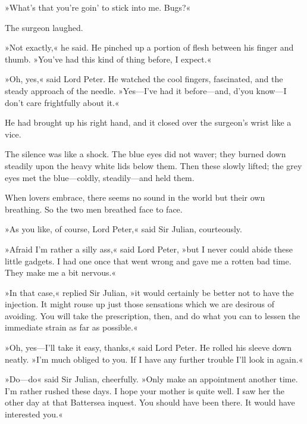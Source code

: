 »What's that you're goin' to stick into me. Bugs?«

The surgeon laughed.

»Not exactly,« he said. He pinched up a portion of flesh between his finger and thumb. »You've had this kind of thing before, I expect.«

»Oh, yes,« said Lord Peter. He watched the cool fingers, fascinated, and the steady approach of the needle. »Yes—I've had it before—and, d'you know—I don't care frightfully about it.«

He had brought up his right hand, and it closed over the surgeon's wrist like a vice.

The silence was like a shock. The blue eyes did not waver; they burned down steadily upon the heavy white lids below them. Then these slowly lifted; the grey eyes met the blue—coldly, steadily—and held them.

When lovers embrace, there seems no sound in the world but their own breathing. So the two men breathed face to face.

»As you like, of course, Lord Peter,« said Sir Julian, courteously.

»Afraid I'm rather a silly ass,« said Lord Peter, »but I never could abide these little gadgets. I had one once that went wrong and gave me a rotten bad time. They make me a bit nervous.«

»In that case,« replied Sir Julian, »it would certainly be better not to have the injection. It might rouse up just those sensations which we are desirous of avoiding. You will take the prescription, then, and do what you can to lessen the immediate strain as far as possible.«

»Oh, yes—I'll take it easy, thanks,« said Lord Peter. He rolled his sleeve down neatly. »I'm much obliged to you. If I have any further trouble I'll look in again.«

»Do—do\longdash« said Sir Julian, cheerfully. »Only make an appointment another time. I'm rather rushed these days. I hope your mother is quite well. I saw her the other day at that Battersea inquest. You should have been there. It would have interested you.«